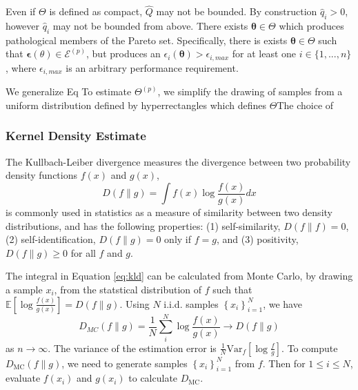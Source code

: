 Even if $\Theta$ is defined as compact, $\hat{Q}$ may not be bounded.  By construction $\hat{q}_i > 0 $, however $\hat{q}_i$ may not be bounded from above.  There exists $\bm{\theta} \in \Theta$ which produces pathological members of the Pareto set.  Specifically, there is exists $\bm{\theta} \in \Theta$ such that $\bm{\epsilon}(\theta) \in \mathcal{E}^(p)$, but produces an $\epsilon_i(\bm{\theta}) > \epsilon_{i,max}$ for at least one $i\in\{1,...,n\}$, where $\epsilon_{i,max}$ is an arbitrary performance requirement.

We generalize Eq
To estimate $\Theta^{(p)}$, we simplify the drawing of samples from a uniform distribution defined by hyperrectangles which defines $\Theta$The choice of
\subsubsection{Kernel Density Estimate}

The Kullbach-Leiber divergence\cite{kullback1951_kld} measures the divergence between two probability density functions $f(x)$ and $g(x)$,
\begin{equation}\label{eq:kld}
   D(f \parallel g) = \int f(x) \log \frac{f(x)}
                                          {g(x)} dx
\end{equation}
is commonly used in statistics as a measure of similarity between two density distributions, and has the following properties: (1) self-similarity, $D(f \parallel f) = 0$, (2) self-identification, $D(f \parallel g) = 0$ only if $f=g$, and (3) positivity, $D(f \parallel g) \geq 0$ for all $f$ and $g$.

The integral in Equation \ref{eq:kld} can be calculated from Monte Carlo\cite{hershey2007_kld_approx}, by drawing a sample $x_i$, from the statstical distribution of $f$ such that $\mathbb{E}\left[\log\frac{f(x)}{g(x)}\right] = D(f \parallel g)$.  Using $N$ i.i.d. samples $\left\{x_i\right\}_{i=1}^N$, we have
\begin{equation}
  \label{eq:kdmc}
  D_{MC}(f \parallel g) = \frac{1}{N}\sum_i^N \log \frac{f(x)}{g(x)}
      \rightarrow D(f \parallel g)
\end{equation}
as $n \rightarrow \infty$.  The variance of the estimation error is $\frac{1}{N}\mathrm{Var}_f\left[\log\frac{f}{g}\right]$.  To compute $D_{\mathrm{MC}}(f \parallel g)$, we need to generate samples $\left\{x_i\right\}_{i=1}^N$ from $f$.  Then for $1 \leq i \leq N$, evaluate $f(x_i)$ and $g(x_i)$ to calculate $D_{\mathrm{MC}}$.


